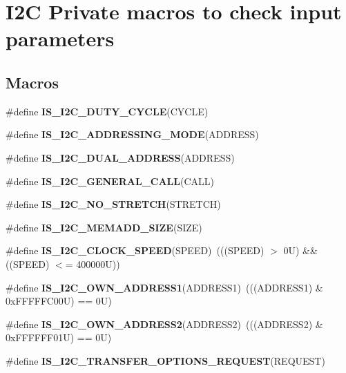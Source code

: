 \hypertarget{group___i2_c___i_s___r_t_c___definitions}{}\section{I2C Private macros to check input parameters}
\label{group___i2_c___i_s___r_t_c___definitions}
\subsection*{Macros}
\begin{DoxyCompactItemize}
\item 
\#define {\bfseries I\+S\+\_\+\+I2\+C\+\_\+\+D\+U\+T\+Y\+\_\+\+C\+Y\+C\+LE}(C\+Y\+C\+LE)
\item 
\#define {\bfseries I\+S\+\_\+\+I2\+C\+\_\+\+A\+D\+D\+R\+E\+S\+S\+I\+N\+G\+\_\+\+M\+O\+DE}(A\+D\+D\+R\+E\+SS)
\item 
\#define {\bfseries I\+S\+\_\+\+I2\+C\+\_\+\+D\+U\+A\+L\+\_\+\+A\+D\+D\+R\+E\+SS}(A\+D\+D\+R\+E\+SS)
\item 
\#define {\bfseries I\+S\+\_\+\+I2\+C\+\_\+\+G\+E\+N\+E\+R\+A\+L\+\_\+\+C\+A\+LL}(C\+A\+LL)
\item 
\#define {\bfseries I\+S\+\_\+\+I2\+C\+\_\+\+N\+O\+\_\+\+S\+T\+R\+E\+T\+CH}(S\+T\+R\+E\+T\+CH)
\item 
\#define {\bfseries I\+S\+\_\+\+I2\+C\+\_\+\+M\+E\+M\+A\+D\+D\+\_\+\+S\+I\+ZE}(S\+I\+ZE)
\item 
\mbox{\label{group___i2_c___i_s___r_t_c___definitions_gae0d731df1b264d853703716c29309b9b}} 
\#define {\bfseries I\+S\+\_\+\+I2\+C\+\_\+\+C\+L\+O\+C\+K\+\_\+\+S\+P\+E\+ED}(S\+P\+E\+ED)~(((S\+P\+E\+ED) $>$ 0\+U) \&\& ((\+S\+P\+E\+E\+D) $<$= 400000\+U))
\item 
\mbox{\label{group___i2_c___i_s___r_t_c___definitions_gad84e8b9523d45b6105b4d5cb68994a79}} 
\#define {\bfseries I\+S\+\_\+\+I2\+C\+\_\+\+O\+W\+N\+\_\+\+A\+D\+D\+R\+E\+S\+S1}(A\+D\+D\+R\+E\+S\+S1)~(((A\+D\+D\+R\+E\+S\+S1) \& 0x\+F\+F\+F\+F\+F\+C00\+U) == 0\+U)
\item 
\mbox{\label{group___i2_c___i_s___r_t_c___definitions_ga83001d53612b83ee90730d3bb2732537}} 
\#define {\bfseries I\+S\+\_\+\+I2\+C\+\_\+\+O\+W\+N\+\_\+\+A\+D\+D\+R\+E\+S\+S2}(A\+D\+D\+R\+E\+S\+S2)~(((A\+D\+D\+R\+E\+S\+S2) \& 0x\+F\+F\+F\+F\+F\+F01\+U) == 0\+U)
\item 
\#define {\bfseries I\+S\+\_\+\+I2\+C\+\_\+\+T\+R\+A\+N\+S\+F\+E\+R\+\_\+\+O\+P\+T\+I\+O\+N\+S\+\_\+\+R\+E\+Q\+U\+E\+ST}(R\+E\+Q\+U\+E\+ST)
\end{DoxyCompactItemize}


